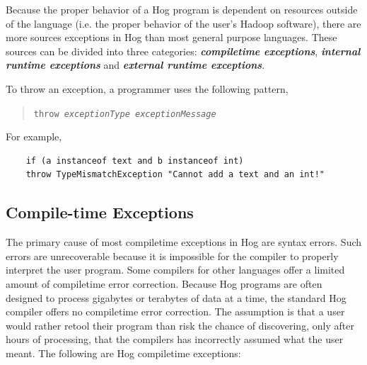 \documentclass{article}
\begin{document}
Because the proper behavior of a Hog program is dependent on resources outside of
the language (i.e. the proper behavior of the user’s Hadoop software), there are
more sources exceptions in Hog than most general purpose languages. These sources
can be divided into three categories: \textbf{\emph{compile­time exceptions}},
\textbf{\emph{internal run­time exceptions}} and \textbf{\emph{external run­time
exceptions}}.

To throw an exception, a programmer uses the following pattern,

\begin{quotation}
\tt throw \rm \emph{exceptionType} \emph{exceptionMessage}
\end{quotation}

\noindent For example,

\begin{verbatim}
    if (a instanceof text and b instanceof int)
    throw TypeMismatchException "Cannot add a text and an int!"
\end{verbatim}

\subsection{Compile-time Exceptions} %
\label{sub:compile_time_exceptions}

The primary cause of most compile­time exceptions in Hog are syntax errors. Such
errors are unrecoverable because it is impossible for the compiler to properly
interpret the user program. Some compilers for other languages offer a limited
amount of compile­time error correction. Because Hog programs are often designed
to process gigabytes or terabytes of data at a time, the standard Hog compiler
offers no compile­time error correction. The assumption is that a user would
rather re­tool their program than risk the chance of discovering, only after hours
of processing, that the compilers has incorrectly assumed what the user meant. The
following are Hog compile­time exceptions:
\end{document}

